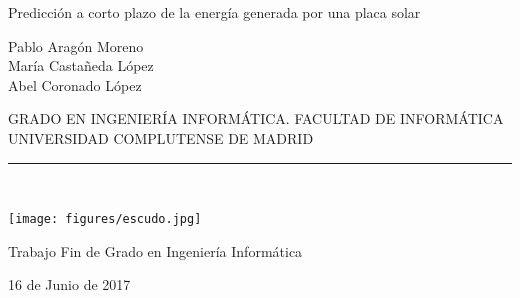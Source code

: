 
\newpage


\thispagestyle{empty}


\begin{center}

   \vspace{1cm}

   {\Large Predicción a corto plazo de la energía
   	 generada por una placa solar}\\

   \vspace{0.5cm}

   \vspace{0.5cm}

   {\large Pablo Aragón Moreno}\\
   {\large María Castañeda López}\\
   {\large Abel Coronado López}\\
 
   \vspace{0.5cm}

   GRADO EN INGENIERÍA INFORMÁTICA. FACULTAD DE INFORMÁTICA\\
   UNIVERSIDAD COMPLUTENSE DE MADRID \\


   \vspace{0.65cm}
   \rule{2in}{0.5pt}\\
   \vspace{0.85cm}

  \texttt{[image: figures/escudo.jpg]}
  

   \vspace{0.5cm}
Trabajo Fin de Grado en Ingeniería Informática

   \vspace{0.5cm}


  16 de Junio de 2017\\
   \vspace{1cm}

\end{center}

